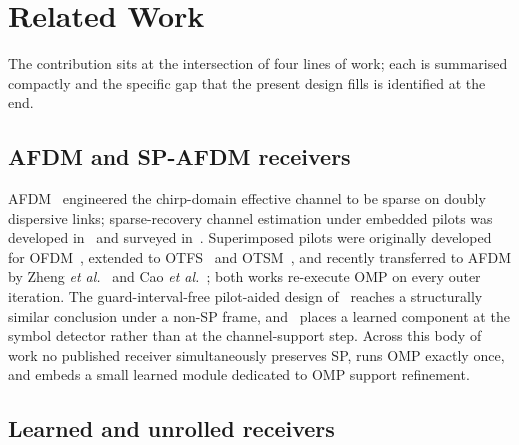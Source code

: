 \section{Related Work}
\label{sec:related}

The contribution sits at the intersection of four lines of work; each is
summarised compactly and the specific gap that the present design fills
is identified at the end.

\subsection{AFDM and SP-AFDM receivers}
\label{ssec:related_afdm}

AFDM~\cite{bemani2023afdm} engineered the chirp-domain effective channel
to be sparse on doubly dispersive links; sparse-recovery channel
estimation under embedded pilots was developed
in~\cite{benzine2023sparseafdm,yin2022fractionaldopplerafdm,yin2024drceafdm,rou2024otfstoafdm}
and surveyed in~\cite{yin2025afdmoverview,zhou2025afdmicsc}. Superimposed
pilots were originally developed for
OFDM~\cite{cui2007superimposed,tugnait2006superimposed,orozco2011superimposed,liang2011iterativesp},
extended to OTFS~\cite{mishra2022otfssp} and
OTSM~\cite{neelam2023otsmsp}, and recently
transferred to AFDM by Zheng \emph{et al.}~\cite{qing2024spafdm} and Cao
\emph{et al.}~\cite{cao2024spomp}; both works re-execute OMP on every
outer iteration. The guard-interval-free pilot-aided design
of~\cite{zhao2024gifreeafdm} reaches a structurally similar conclusion
under a non-SP frame, and~\cite{afdm2025jointcesd} places a learned
component at the symbol detector rather than at the channel-support
step. Across this body of work no published receiver
simultaneously preserves SP, runs OMP exactly once, and embeds a small
learned module dedicated to OMP support refinement.

\subsection{Learned and unrolled receivers}
\label{ssec:related_learned}

